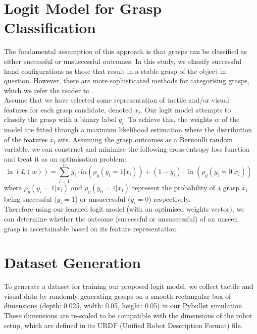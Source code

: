 \documentclass[11pt, a4paper]{report}
\begin{document}
\section{Logit Model for Grasp Classification}\label{sec:4.1}
The fundamental assumption of this approach is that grasps can be classified as either successful or unsuccessful outcomes.  In this study, we classify successful hand configurations as those that result in a stable grasp of the object in question. However, there are more sophisticated methods for categorising grasps, which we refer the reader to \cite{Bekiroglu2012LearningTA, si2022grasp}.\\

Assume that we have selected some representation of tactile and/or visual features for each grasp candidate, denoted $x_i$. Our logit model attempts to classify the grasp with a binary label $y_i$. To achieve this, the weights $w$ of the model are fitted through a maximum likelihood estimation where the distribution of the features $x_i$ sits. Assuming the grasp outcomes as a Bernoulli random variable, we can construct and minimise the following cross-entropy loss function and treat it as an optimisation problem:
\begin{equation}
    \ln(L(w))=\sum^n_{i=1}y_i\cdot ln(\rho_y(y_i=1|x_i))+(1-y_i)\cdot\ln(\rho_y(y_i=0|x_i))
\end{equation}
where $\rho_y(y_i=1|x_i)$ and $\rho_y(y_0=1|x_i)$ represent the probability of a grasp $x_i$ being successful ($y_i=1$) or unsuccessful ($y_i=0$) respectively.\\

Therefore using our learned logit model (with an optimised weights vector), we can determine whether the outcome (successful or unsuccessful) of an unseen grasp is ascertainable based on its feature representation.


\newpage
\section{Dataset Generation}\label{sec:4.2}
To generate a dataset for training our proposed logit model, we collect tactile and visual data by randomly generating grasps on a smooth rectangular box of dimensions (depth: 0.025, width: 0.05, height: 0.05) in our Pybullet simulation. These dimensions are re-scaled to be compatible with the dimensions of the robot setup, which are defined in its URDF (Unified Robot Description Format) file.
\end{document}
